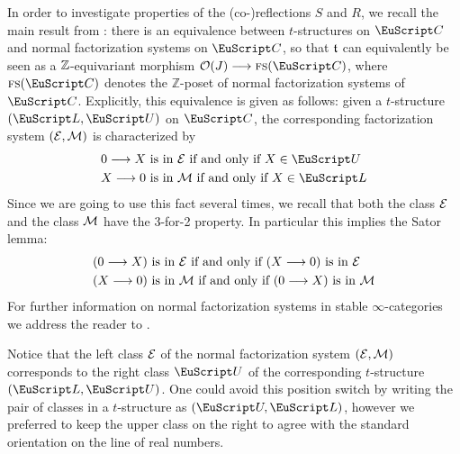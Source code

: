 In order to investigate properties of the (co-)reflections $S$ and $R$, we recall the main result from \cite{Fiorenza2014}: there is an equivalence between $t$-structures on $\C$ and normal factorization systems on $\C$, so that $\mathfrak{t}$ can equivalently be seen as a $\mathbb{Z}$-equivariant morphism $\O(J)\to  \fs(\C)$, where $\fs(\C)$ denotes the $\mathbb{Z}$-poset of normal factorization systems of $\C$. Explicitly, this equivalence is given as follows: given a $t$-structure $(\cate{L},\cate{U})$ on $\C$,
the corresponding factorization system $(\mathcal{E},\mathcal{M})$ is characterized by
\begin{align*}
0\to X &\text{ is in }\E\text{ if and only if }X\in \cate{U}\\
X\to 0 &\text{ is in }\M\text{ if and only if }X\in \cate{L}
\end{align*}
Since we are going to use this fact several times, we recall that both the class $\mathcal{E}$ and the class $\mathcal{M}$ have the 3-for-2 property. In particular this implies the Sator lemma:
\begin{align*}
(0\longrightarrow X) &\text{ is in }\mathcal{E} \text{ if and only if }(X\longrightarrow 0) \text{ is in }\mathcal{E}\\
(X\longrightarrow 0) &\text{ is in }\mathcal{M} \text{ if and only if }(0\longrightarrow X) \text{ is in }\mathcal{M}
\end{align*}
For further information on normal factorization systems in stable $\infty$-categories we address the reader to \cite{Fiorenza2014,tstructures}.

\begin{remark}
Notice that the left class $\mathcal{E}$ of the normal factorization system $(\mathcal{E},\mathcal{M})$ corresponds to the right class $\cate{U}$ of the corresponding $t$-structure $(\cate{L},\cate{U})$. One could avoid this position switch by writing the pair of classes in a $t$-structure as $(\cate{U},\cate{L})$, however we preferred to keep the upper class on the right to agree with the standard orientation on the line of real numbers.
\end{remark}

